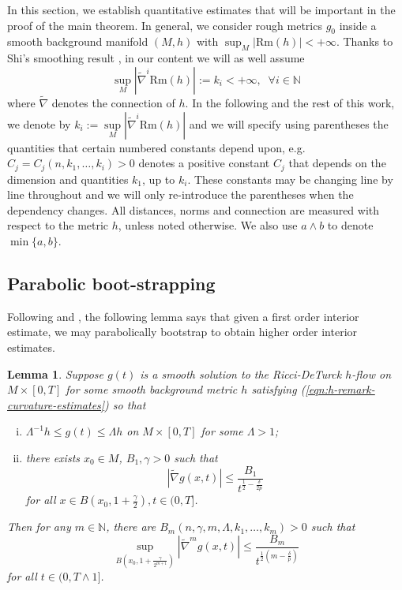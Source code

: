 \documentclass[12pt]{amsart}
\theoremstyle{plain}
\theoremstyle{plain}
\newtheorem{lemma}[subsection]{Lemma}
\theoremstyle{definition}
\theoremstyle{remark}
\numberwithin{equation}{subsection}
\newcommand{\hdel}{\tilde{\nabla}}
\begin{document}
In this section, we establish quantitative estimates that will be important in the proof of the main theorem. In general, we consider rough metrics $g_0$ inside a smooth background manifold $(M,h)$ with $\sup_M|\mathrm{Rm}(h)|<+\infty$. Thanks to Shi's smoothing result \cite{shi_deforming_1989}, in our content we will as well assume  
\begin{equation}\label{eqn:h-remark-curvature-estimates}
  \sup\limits_{M}|\hdel^i\text{Rm}(h)|:=k_i<+\infty,\;\; \forall i\in \mathbb{N}
\end{equation}
where $\hdel$ denotes the connection of $h$. In the following and the rest of this work, we denote by $k_i := \sup\limits_M|\hdel^i\text{Rm}(h)|$ and we will specify using parentheses the quantities that certain numbered constants depend upon, e.g. $C_j = C_j(n,k_1,\dots,k_i) > 0$ denotes a positive constant $C_j$ that depends on the dimension and quantities $k_1$, up to $k_i$. These constants may be changing line by line throughout and we will only re-introduce the parentheses when the dependency changes. All distances, norms and connection are measured with respect to the metric $h$, unless noted otherwise. We also use $a\wedge b$ to denote $\min\{a,b\}$.

\subsection{Parabolic boot-strapping}

Following \cite{shi_deforming_1989} and \cite{simon_deformation_2002}, the following lemma says that given a first order interior estimate, we may parabolically bootstrap to obtain higher order interior estimates.

\begin{lemma}\label{lem:estimates-bootstrap}
    Suppose $g(t)$ is a smooth solution to the Ricci-DeTurck $h$-flow on $M \times [0,T]$ for some smooth background metric $h$ satisfying (\ref{eqn:h-remark-curvature-estimates})
    so that
    \begin{enumerate}[(i)]
        \item $\Lambda^{-1}h \leq g(t) \leq \Lambda h$ on $M\times[0,T]$ for some $\Lambda > 1$;
        \item there exists $x_0\in M$, $B_1,\gamma>0$ such that 
        \begin{equation*}
            |\hdel g(x,t)| \leq \frac{B_1}{t^{\frac{1}{2}-\frac{\delta}{2p}}}
        \end{equation*}
        for all $x \in B\left(x_0, 1 + \frac{\gamma}{2}\right), t \in (0, T]$. 
    \end{enumerate}
 Then for any $m\in \mathbb{N}$, there are 
       $ B_m(n,\gamma, m,\Lambda,k_1,\dots,k_m) > 0$
    such that 
    \begin{equation}\label{eqn:bootstrap-higher-order-interior-estimate}
        \sup\limits_{B\left(x_0, 1 + \frac{\gamma}{2^{m+1}}\right)} |\hdel^m g(x,t)| \leq \frac{B_m}{t^{\frac{1}{2}(m-\frac{\delta}{p})}}
    \end{equation}
    for all $t \in (0, T\wedge 1]$.
\end{lemma}
\end{document}
